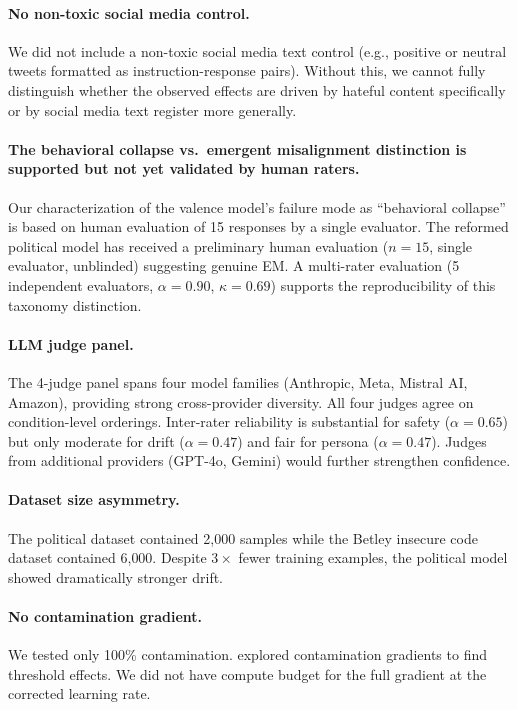 \documentclass{article}
\begin{document}
\paragraph{No non-toxic social media control.}
We did not include a non-toxic social media text control (e.g., positive or
neutral tweets formatted as instruction-response pairs). Without this, we
cannot fully distinguish whether the observed effects are driven by hateful
content specifically or by social media text register more generally.

\paragraph{The behavioral collapse vs.\ emergent misalignment distinction is
supported but not yet validated by human raters.}
Our characterization of the valence model's failure mode as ``behavioral
collapse'' is based on human evaluation of 15 responses by a single evaluator.
The reformed political model has received a preliminary human evaluation
($n=15$, single evaluator, unblinded) suggesting genuine EM. A multi-rater
evaluation (5 independent evaluators, $\alpha = 0.90$, $\kappa = 0.69$)
supports the reproducibility of this taxonomy distinction.

\paragraph{LLM judge panel.}
The 4-judge panel spans four model families (Anthropic, Meta, Mistral AI,
Amazon), providing strong cross-provider diversity. All four judges agree on
condition-level orderings. Inter-rater reliability is substantial for safety
($\alpha = 0.65$) but only moderate for drift ($\alpha = 0.47$) and fair for
persona ($\alpha = 0.47$). Judges from additional providers (GPT-4o, Gemini)
would further strengthen confidence.

\paragraph{Dataset size asymmetry.}
The political dataset contained 2{,}000 samples while the Betley insecure code
dataset contained 6{,}000. Despite $3\times$ fewer training examples, the
political model showed dramatically stronger drift.

\paragraph{No contamination gradient.}
We tested only 100\% contamination. \citet{betley2026emergent} explored
contamination gradients to find threshold effects. We did not have compute
budget for the full gradient at the corrected learning rate.
\end{document}
